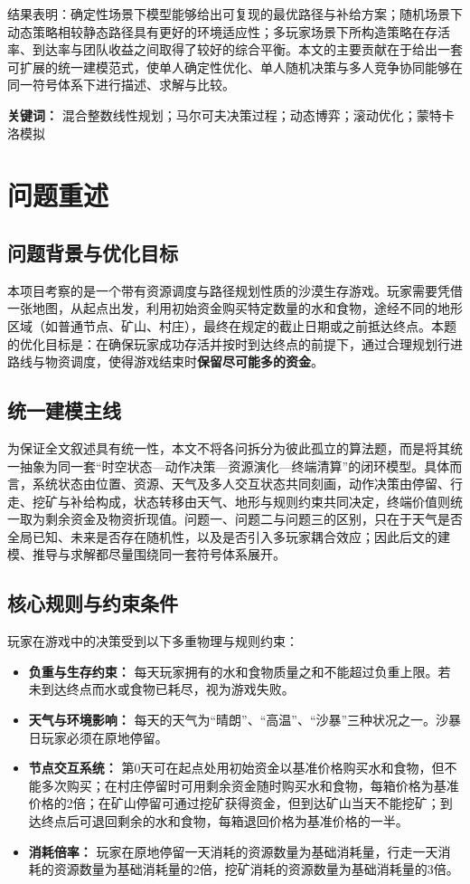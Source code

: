 \documentclass[UTF8,a4paper,12pt]{ctexart}
\begin{document}
结果表明：确定性场景下模型能够给出可复现的最优路径与补给方案；随机场景下动态策略相较静态路径具有更好的环境适应性；多玩家场景下所构造策略在存活率、到达率与团队收益之间取得了较好的综合平衡。本文的主要贡献在于给出一套可扩展的统一建模范式，使单人确定性优化、单人随机决策与多人竞争协同能够在同一符号体系下进行描述、求解与比较。

\vspace{1.2em}
\noindent\textbf{关键词：} 混合整数线性规划；马尔可夫决策过程；动态博弈；滚动优化；蒙特卡洛模拟

\vspace{1.5em}


\section{问题重述}

\subsection{问题背景与优化目标}
本项目考察的是一个带有资源调度与路径规划性质的沙漠生存游戏。玩家需要凭借一张地图，从起点出发，利用初始资金购买特定数量的水和食物，途经不同的地形区域（如普通节点、矿山、村庄），最终在规定的截止日期或之前抵达终点。本题的优化目标是：在确保玩家成功存活并按时到达终点的前提下，通过合理规划行进路线与物资调度，使得游戏结束时\textbf{保留尽可能多的资金}。

\subsection{统一建模主线}
为保证全文叙述具有统一性，本文不将各问拆分为彼此孤立的算法题，而是将其统一抽象为同一套“时空状态—动作决策—资源演化—终端清算”的闭环模型。具体而言，系统状态由位置、资源、天气及多人交互状态共同刻画，动作决策由停留、行走、挖矿与补给构成，状态转移由天气、地形与规则约束共同决定，终端价值则统一取为剩余资金及物资折现值。问题一、问题二与问题三的区别，只在于天气是否全局已知、未来是否存在随机性，以及是否引入多玩家耦合效应；因此后文的建模、推导与求解都尽量围绕同一套符号体系展开。

\subsection{核心规则与约束条件}
玩家在游戏中的决策受到以下多重物理与规则约束：
\begin{itemize}
    \item \textbf{负重与生存约束：} 每天玩家拥有的水和食物质量之和不能超过负重上限。若未到达终点而水或食物已耗尽，视为游戏失败。
    \item \textbf{天气与环境影响：} 每天的天气为“晴朗”、“高温”、“沙暴”三种状况之一。沙暴日玩家必须在原地停留。
    \item \textbf{节点交互系统：} 第0天可在起点处用初始资金以基准价格购买水和食物，但不能多次购买；在村庄停留时可用剩余资金随时购买水和食物，每箱价格为基准价格的2倍；在矿山停留可通过挖矿获得资金，但到达矿山当天不能挖矿；到达终点后可退回剩余的水和食物，每箱退回价格为基准价格的一半。
    \item \textbf{消耗倍率：} 玩家在原地停留一天消耗的资源数量为基础消耗量，行走一天消耗的资源数量为基础消耗量的2倍，挖矿消耗的资源数量为基础消耗量的3倍。
\end{itemize}
\end{document}

